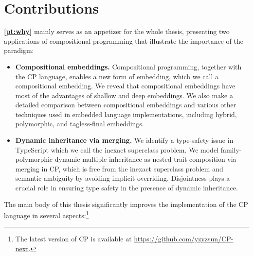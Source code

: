 \section{Contributions}

\textbf{\autoref{pt:why}} mainly serves as an appetizer for the whole thesis,
presenting two applications of compositional programming that illustrate the
importance of the paradigm:
\begin{itemize}
\item \textbf{Compositional embeddings.} Compositional programming, together
      with the CP language, enables a new form of embedding, which we call a
      compositional embedding. We reveal that compositional embeddings have most
      of the advantages of shallow and deep embeddings. We also make a detailed
      comparison between compositional embeddings and various other techniques
      used in embedded language implementations, including hybrid, polymorphic,
      and tagless-final embeddings.
\item \textbf{Dynamic inheritance via merging.} We identify a type-safety issue
      in TypeScript which we call the inexact superclass problem. We model
      family-polymorphic dynamic multiple inheritance as nested trait
      composition via merging in CP, which is free from the inexact superclass
      problem and semantic ambiguity by avoiding implicit overriding.
      Disjointness plays a crucial role in ensuring type safety in the presence
      of dynamic inheritance.
\end{itemize}
The main body of this thesis significantly improves the implementation of the CP
language in several aspects:\footnote{The latest version of CP is available at
\url{https://github.com/yzyzsun/CP-next}.}
